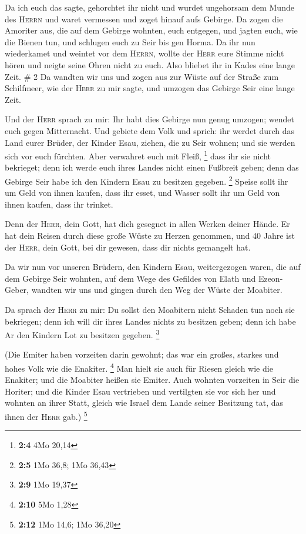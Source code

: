  Da ich euch das sagte, gehorchtet ihr nicht und wurdet
ungehorsam dem Munde des \textsc{Herrn} und waret vermessen und zoget
hinauf aufs Gebirge.  Da zogen die Amoriter aus, die auf
dem Gebirge wohnten, euch entgegen, und jagten euch, wie die Bienen tun,
und schlugen euch zu Seir bis gen Horma.  Da ihr nun
wiederkamet und weintet vor dem \textsc{Herrn}, wollte der \textsc{Herr}
eure Stimme nicht hören und neigte seine Ohren nicht zu euch.
 Also bliebet ihr in Kades eine lange Zeit. \# 2
 Da wandten wir uns und zogen aus zur Wüste auf der Straße
zum Schilfmeer, wie der \textsc{Herr} zu mir sagte, und umzogen das
Gebirge Seir eine lange Zeit.

 Und der \textsc{Herr} sprach zu mir:  Ihr
habt dies Gebirge nun genug umzogen; wendet euch gegen Mitternacht.
 Und gebiete dem Volk und sprich: ihr werdet durch das
Land eurer Brüder, der Kinder Esau, ziehen, die zu Seir wohnen; und sie
werden sich vor euch fürchten. Aber verwahret euch mit Fleiß,
\footnote{\textbf{2:4} 4Mo 20,14}  dass ihr sie nicht
bekrieget; denn ich werde euch ihres Landes nicht einen Fußbreit geben;
denn das Gebirge Seir habe ich den Kindern Esau zu besitzen gegeben.
\footnote{\textbf{2:5} 1Mo 36,8; 1Mo 36,43}  Speise sollt
ihr um Geld von ihnen kaufen, dass ihr esset, und Wasser sollt ihr um
Geld von ihnen kaufen, dass ihr trinket.

 Denn der \textsc{Herr}, dein Gott, hat dich gesegnet in
allen Werken deiner Hände. Er hat dein Reisen durch diese große Wüste zu
Herzen genommen, und 40 Jahre ist der \textsc{Herr}, dein Gott, bei dir
gewesen, dass dir nichts gemangelt hat.

 Da wir nun vor unseren Brüdern, den Kindern Esau,
weitergezogen waren, die auf dem Gebirge Seir wohnten, auf dem Wege des
Gefildes von Elath und Ezeon-Geber, wandten wir uns und gingen durch den
Weg der Wüste der Moabiter.

 Da sprach der \textsc{Herr} zu mir: Du sollst den
Moabitern nicht Schaden tun noch sie bekriegen; denn ich will dir ihres
Landes nichts zu besitzen geben; denn ich habe Ar den Kindern Lot zu
besitzen gegeben. \footnote{\textbf{2:9} 1Mo 19,37}

 (Die Emiter haben vorzeiten darin gewohnt; das war ein
großes, starkes und hohes Volk wie die Enakiter. \footnote{\textbf{2:10}
  5Mo 1,28}  Man hielt sie auch für Riesen gleich wie die
Enakiter; und die Moabiter heißen sie Emiter.  Auch
wohnten vorzeiten in Seir die Horiter; und die Kinder Esau vertrieben
und vertilgten sie vor sich her und wohnten an ihrer Statt, gleich wie
Israel dem Lande seiner Besitzung tat, das ihnen der \textsc{Herr} gab.)
\footnote{\textbf{2:12} 1Mo 14,6; 1Mo 36,20}

